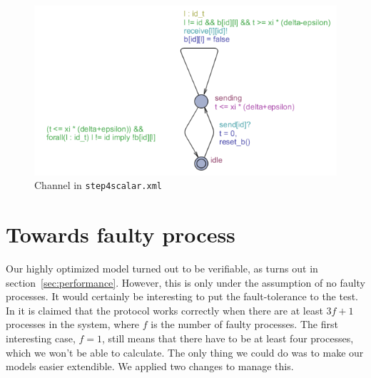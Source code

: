 \documentclass[a4paper,10pt]{article}
\begin{document}
\begin{enumerate}
\begin{figure}[!h]
\includegraphics{step4scalar_channel}
\caption{Channel in \texttt{step4scalar.xml}\label{fig:step4scalar_channel}}
\end{figure}

\end{enumerate}


\section{Towards faulty process\label{sec:faulty}}

Our highly optimized model turned out to be verifiable, as turns out in section~\ref{sec:performance}. However, this is only under the assumption of no faulty processes. It would certainly be interesting to put the fault-tolerance to the test. In \cite{Welch1984Anew} it is claimed that the protocol works correctly when there are at least \(3f+1\) processes in the system, where \(f\) is the number of faulty processes. The first interesting case, \(f=1\), still means that there have to be at least four processes, which we won't be able to calculate. The only thing we could do was to make our models easier extendible. We applied two changes to manage this.

\end{document}
